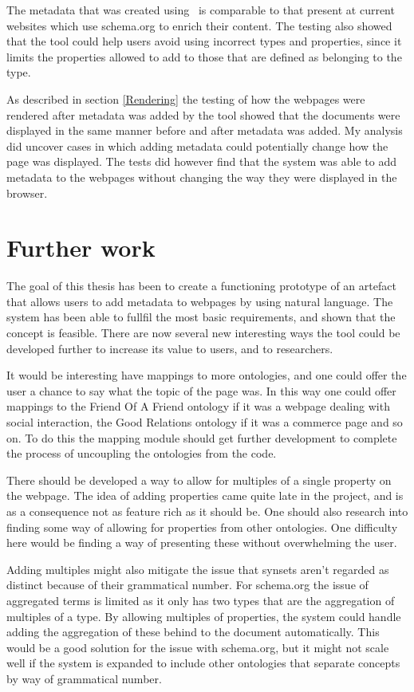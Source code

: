 The metadata that was created using \theartefact\ is comparable to that present at current websites which use schema.org to
enrich their content.
The testing also showed that the tool could help users avoid using incorrect types and properties,
since it limits the properties allowed to add to those that are defined as belonging to the type.

As described in section \ref{Rendering} the testing of how the webpages were rendered after metadata was added by the tool
showed that the documents were displayed in the same manner before and after metadata was added.
My analysis did uncover cases in which adding metadata could potentially change how the page was displayed.
The tests did however find that the system was able to add metadata to the webpages without changing the way they were displayed in the browser.


\section{Further work}
The goal of this thesis has been to create a functioning prototype of an artefact that allows users to add metadata
to webpages by using natural language.
The system has been able to fullfil the most basic requirements, and shown that the concept is feasible.
There are now several new interesting ways the tool could be developed further to increase its value to users,
and to researchers.

It would be interesting have mappings to more ontologies,
and one could offer the user a chance to say what the topic of the page was.
In this way one could offer mappings to the Friend Of A Friend ontology if it was a webpage dealing with
social interaction, the Good Relations ontology if it was a commerce page and so on.
To do this the mapping module should get further development to complete the process of uncoupling the ontologies
from the code.

There should be developed a way to allow for multiples of a single property on the webpage.
The idea of adding properties came quite late in the project,
and is as a consequence not as feature rich as it should be.
One should also research into finding some way of allowing for properties from other ontologies.
One difficulty here would be finding a way of presenting these without overwhelming the user.

Adding multiples might also mitigate the issue that synsets aren't regarded as distinct because of their grammatical number.
For schema.org the issue of aggregated terms is limited as it only has two types that are the aggregation of multiples of a type.
By allowing multiples of properties, the system could handle adding the aggregation of these behind to the document automatically.
This would be a good solution for the issue with schema.org,
but it might not scale well if the system is expanded to include other ontologies that separate concepts by way of grammatical number.


